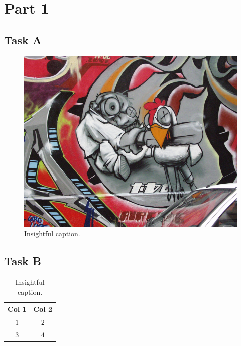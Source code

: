 \documentclass{article}
\begin{document}
\section{Part 1}
\subsection{Task A}

\lipsum[1-3]

\begin{figure}[H]
    \centering
    \includegraphics[width=0.5\linewidth]{graf.png}
    \caption{Insightful caption.}
    \label{fig:placeholder}
\end{figure}

\subsection{Task B}

\lipsum[1-3]

\begin{table}[H]
    \centering
    \begin{tabular}{c|c}
        \toprule
        Col 1 & Col 2 \\
        \midrule
        $1$ & $2$ \\
        \midrule
        $3 $& $4$ \\
        \bottomrule
    \end{tabular}
    \caption{Insightful caption.}
    \label{tab:placeholder}
\end{table}
\end{document}
